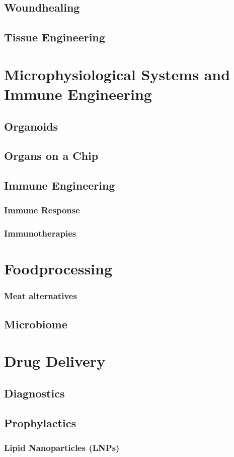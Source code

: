 \documentclass[12pt]{cheatsheet}
\begin{document}
\subsection*{Woundhealing}

\subsection*{Tissue Engineering}


\section*{Microphysiological Systems and Immune Engineering}
\subsection*{Organoids}

\subsection*{Organs on a Chip}

\subsection*{Immune Engineering}

\subsubsection*{Immune Response}

\subsubsection*{Immunotherapies}


\section*{Foodprocessing}

\subsubsection*{Meat alternatives}

\subsection*{Microbiome}


\section*{Drug Delivery}
\subsection*{Diagnostics}

\subsection*{Prophylactics}

\subsubsection*{Lipid Nanoparticles (LNPs)}


\vfill \null \columnbreak


\end{document}
